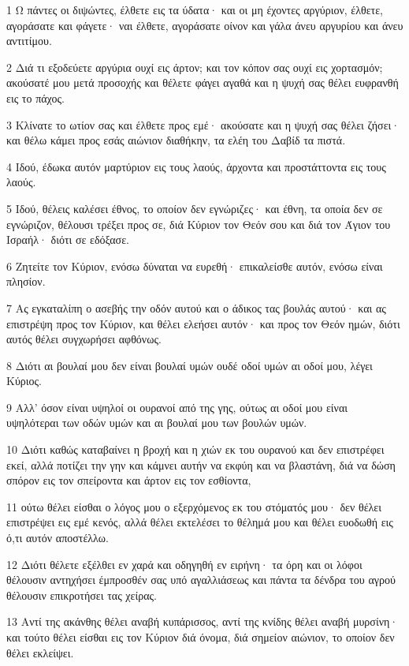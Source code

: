\par 1 Ω πάντες οι διψώντες, έλθετε εις τα ύδατα· και οι μη έχοντες αργύριον, έλθετε, αγοράσατε και φάγετε· ναι έλθετε, αγοράσατε οίνον και γάλα άνευ αργυρίου και άνευ αντιτίμου.
\par 2 Διά τι εξοδεύετε αργύρια ουχί εις άρτον; και τον κόπον σας ουχί εις χορτασμόν; ακούσατέ μου μετά προσοχής και θέλετε φάγει αγαθά και η ψυχή σας θέλει ευφρανθή εις το πάχος.
\par 3 Κλίνατε το ωτίον σας και έλθετε προς εμέ· ακούσατε και η ψυχή σας θέλει ζήσει· και θέλω κάμει προς εσάς αιώνιον διαθήκην, τα ελέη του Δαβίδ τα πιστά.
\par 4 Ιδού, έδωκα αυτόν μαρτύριον εις τους λαούς, άρχοντα και προστάττοντα εις τους λαούς.
\par 5 Ιδού, θέλεις καλέσει έθνος, το οποίον δεν εγνώριζες· και έθνη, τα οποία δεν σε εγνώριζον, θέλουσι τρέξει προς σε, διά Κύριον τον Θεόν σου και διά τον Άγιον του Ισραήλ· διότι σε εδόξασε.
\par 6 Ζητείτε τον Κύριον, ενόσω δύναται να ευρεθή· επικαλείσθε αυτόν, ενόσω είναι πλησίον.
\par 7 Ας εγκαταλίπη ο ασεβής την οδόν αυτού και ο άδικος τας βουλάς αυτού· και ας επιστρέψη προς τον Κύριον, και θέλει ελεήσει αυτόν· και προς τον Θεόν ημών, διότι αυτός θέλει συγχωρήσει αφθόνως.
\par 8 Διότι αι βουλαί μου δεν είναι βουλαί υμών ουδέ οδοί υμών αι οδοί μου, λέγει Κύριος.
\par 9 Αλλ' όσον είναι υψηλοί οι ουρανοί από της γης, ούτως αι οδοί μου είναι υψηλότεραι των οδών υμών και αι βουλαί μου των βουλών υμών.
\par 10 Διότι καθώς καταβαίνει η βροχή και η χιών εκ του ουρανού και δεν επιστρέφει εκεί, αλλά ποτίζει την γην και κάμνει αυτήν να εκφύη και να βλαστάνη, διά να δώση σπόρον εις τον σπείροντα και άρτον εις τον εσθίοντα,
\par 11 ούτω θέλει είσθαι ο λόγος μου ο εξερχόμενος εκ του στόματός μου· δεν θέλει επιστρέψει εις εμέ κενός, αλλά θέλει εκτελέσει το θέλημά μου και θέλει ευοδωθή εις ό,τι αυτόν αποστέλλω.
\par 12 Διότι θέλετε εξέλθει εν χαρά και οδηγηθή εν ειρήνη· τα όρη και οι λόφοι θέλουσιν αντηχήσει έμπροσθέν σας υπό αγαλλιάσεως και πάντα τα δένδρα του αγρού θέλουσιν επικροτήσει τας χείρας.
\par 13 Αντί της ακάνθης θέλει αναβή κυπάρισσος, αντί της κνίδης θέλει αναβή μυρσίνη· και τούτο θέλει είσθαι εις τον Κύριον διά όνομα, διά σημείον αιώνιον, το οποίον δεν θέλει εκλείψει.

